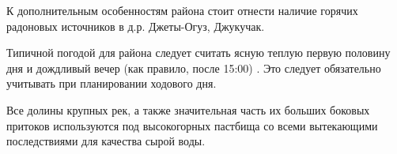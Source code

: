 К дополнительным особенностям района стоит отнести наличие горячих радоновых источников в д.р. Джеты-Огуз, Джукучак.

Типичной погодой для района следует считать ясную теплую первую половину дня и дождливый вечер (как правило, после 15:00) \cite{rodina2012, tipsina2024, sergeev2024, smurov2024}. Это следует обязательно учитывать при планировании ходового дня.

Все долины крупных рек, а также значительная часть их больших боковых притоков используются под высокогорных пастбища со всеми вытекающими последствиями для качества сырой воды.

\clearpage